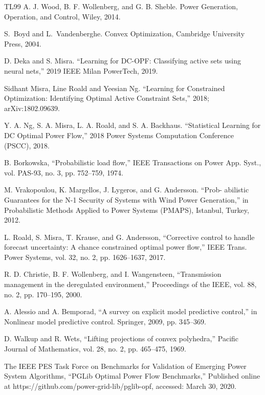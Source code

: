 \documentclass[11pt]{article}
\begin{document}
\begin{thebibliography} {TL99}
 {\sc A. J. Wood, B. F. Wollenberg, and G. B. Sheble.} Power Generation, Operation, and Control, Wiley, 2014.

 {\sc S.\ Boyd and L.\ Vandenberghe.} Convex Optimization, Cambridge University Press, 2004.

{D. Deka and S. Misra.}
“Learning for DC-OPF: Classifying active sets using neural nets,” 2019 IEEE Milan PowerTech, 2019.

Sidhant Misra, Line Roald and Yeesian Ng.
\newblock “Learning for Constrained Optimization: Identifying Optimal Active Constraint Sets,” 2018;
\newblock arXiv:1802.09639.

{\sc Y. A. Ng, S. A. Misra, L. A. Roald, and S. A. Backhaus.}
“Statistical Learning for DC Optimal Power Flow,” 2018 Power Systems Computation Conference (PSCC), 2018.

\bibitem{}
{\sc B. Borkowska,}
“Probabilistic load flow,” IEEE Transactions on Power App. Syst., vol. PAS-93, no. 3, pp. 752–759, 1974.

\bibitem{}
{\sc M. Vrakopoulou, K. Margellos, J. Lygeros, and G. Andersson.}
“Prob- abilistic Guarantees for the N-1 Security of Systems with Wind Power Generation,” in Probabilistic Methods Applied to Power Systems (PMAPS), Istanbul, Turkey, 2012.

\bibitem{}
{\sc L. Roald, S. Misra, T. Krause, and G. Andersson,}
“Corrective control to handle forecast uncertainty: A chance constrained optimal power flow,” IEEE Trans. Power Systems, vol. 32, no. 2, pp. 1626–1637, 2017.

\bibitem{}
{\sc R. D. Christie, B. F. Wollenberg, and I. Wangensteen,}
“Transmission management in the deregulated environment,” Proceedings of the IEEE, vol. 88, no. 2, pp. 170–195, 2000.

\bibitem{}
{\sc A. Alessio and A. Bemporad,}
“A survey on explicit model predictive control,” in Nonlinear model predictive control. Springer, 2009, pp. 345–369.

\bibitem{}
{\sc D. Walkup and R. Wets,}
“Lifting projections of convex polyhedra,” Pacific Journal of Mathematics, vol. 28, no. 2, pp. 465–475, 1969.

{}
The IEEE PES Task Force on Benchmarks for Validation of Emerging Power System Algorithms, “PGLib Optimal Power Flow Benchmarks,” Published online at https://github.com/power-grid-lib/pglib-opf, accessed: March 30, 2020.

\end{thebibliography}
\end{document}
